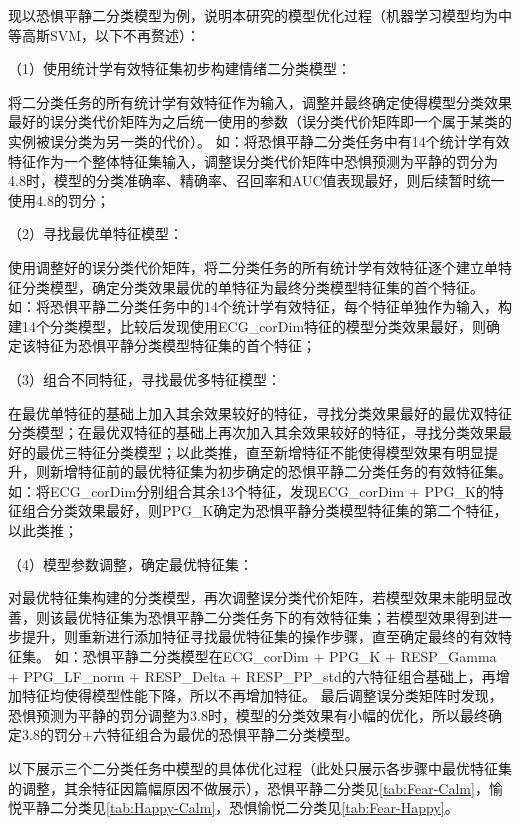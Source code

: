 现以恐惧平静二分类模型为例，说明本研究的模型优化过程（机器学习模型均为中等高斯SVM，以下不再赘述）：

（1）使用统计学有效特征集初步构建情绪二分类模型：

将二分类任务的所有统计学有效特征作为输入，调整并最终确定使得模型分类效果最好的误分类代价矩阵为之后统一使用的参数（误分类代价矩阵即一个属于某类的实例被误分类为另一类的代价）。
如：将恐惧平静二分类任务中有14个统计学有效特征作为一个整体特征集输入，调整误分类代价矩阵中恐惧预测为平静的罚分为4.8时，模型的分类准确率、精确率、召回率和AUC值表现最好，则后续暂时统一使用4.8的罚分；

（2）寻找最优单特征模型：

使用调整好的误分类代价矩阵，将二分类任务的所有统计学有效特征逐个建立单特征分类模型，确定分类效果最优的单特征为最终分类模型特征集的首个特征。
如：将恐惧平静二分类任务中的14个统计学有效特征，每个特征单独作为输入，构建14个分类模型，比较后发现使用ECG\_corDim特征的模型分类效果最好，则确定该特征为恐惧平静分类模型特征集的首个特征；

（3）组合不同特征，寻找最优多特征模型：

在最优单特征的基础上加入其余效果较好的特征，寻找分类效果最好的最优双特征分类模型；在最优双特征的基础上再次加入其余效果较好的特征，寻找分类效果最好的最优三特征分类模型；以此类推，直至新增特征不能使得模型效果有明显提升，则新增特征前的最优特征集为初步确定的恐惧平静二分类任务的有效特征集。
如：将ECG\_corDim分别组合其余13个特征，发现ECG\_corDim + PPG\_K的特征组合分类效果最好，则PPG\_K确定为恐惧平静分类模型特征集的第二个特征，以此类推；

（4）模型参数调整，确定最优特征集：

对最优特征集构建的分类模型，再次调整误分类代价矩阵，若模型效果未能明显改善，则该最优特征集为恐惧平静二分类任务下的有效特征集；若模型效果得到进一步提升，则重新进行添加特征寻找最优特征集的操作步骤，直至确定最终的有效特征集。
如：恐惧平静二分类模型在ECG\_corDim + PPG\_K + RESP\_Gamma + PPG\_LF\_norm + RESP\_Delta + RESP\_PP\_std的六特征组合基础上，再增加特征均使得模型性能下降，所以不再增加特征。
最后调整误分类矩阵时发现，恐惧预测为平静的罚分调整为3.8时，模型的分类效果有小幅的优化，所以最终确定3.8的罚分+六特征组合为最优的恐惧平静二分类模型。

以下展示三个二分类任务中模型的具体优化过程（此处只展示各步骤中最优特征集的调整，其余特征因篇幅原因不做展示），恐惧平静二分类见\autoref{tab:Fear-Calm}，愉悦平静二分类见\autoref{tab:Happy-Calm}，恐惧愉悦二分类见\autoref{tab:Fear-Happy}。

